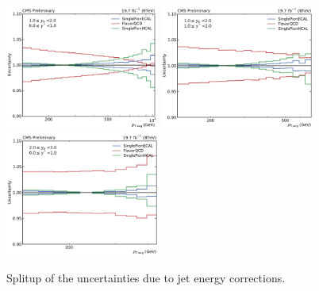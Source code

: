 \begin{figure}[htbp]
    \includegraphics[width=0.45\textwidth]{figures/measurement/jec_relunc_1_yb1ys0.pdf}
    \includegraphics[width=0.45\textwidth]{figures/measurement/jec_relunc_1_yb1ys1.pdf}\hfill
    \includegraphics[width=0.45\textwidth]{figures/measurement/jec_relunc_1_yb2ys0.pdf}
    \caption{Splitup of the uncertainties due to jet energy corrections.}
    \label{fig:jec_relunc_1}
\end{figure}

